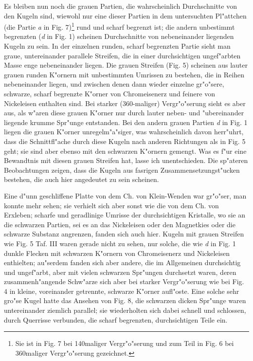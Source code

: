 \documentclass[a4paper, 11pt, oneside]{article}
\begin{document}
Es bleiben nun noch die grauen Partien, die wahrscheinlich Durchschnitte von den Kugeln sind, wiewohl nur eine dieser Partien in dem untersuchten Pl"attchen (die Partie \emph{a} in Fig. 7)\footnote{Sie ist in Fig. 7 bei 140maliger Vergr"o"serung und zum Teil in Fig. 6 bei 360maliger Vergr"o"serung gezeichnet.} rund und scharf begrenzt ist; die andern unbestimmt begrenzten (\emph{d} in Fig. 1) scheinen Durchschnitte von nebeneinander liegenden Kugeln zu sein. In der einzelnen runden, scharf begrenzten Partie sieht man graue, untereinander parallele Streifen, die in einer durchsichtigen ungef"arbten Masse enge nebeneinander liegen. Die grauen Streifen (Fig. 5) scheinen aus lauter grauen runden K"ornern mit unbestimmten Umrissen zu bestehen, die in Reihen nebeneinander liegen, und zwischen denen dann wieder einzelne gr"o"sere, schwarze, scharf begrenzte K"orner von Chromeisenerz und feinere von Nickeleisen enthalten sind. Bei starker (360-maliger) Vergr"o"serung sieht es aber aus, als w"aren diese grauen K"orner nur durch lauter neben- und "ubereinander liegende krumme Spr"unge entstanden. Bei den andern grauen Partien \emph{d} in Fig. 1 liegen die grauen K"orner unregelm"a"siger, was wahrscheinlich davon herr"uhrt, dass die Schnittfl"ache durch diese Kugeln nach anderen Richtungen als in Fig. 5 geht; sie sind aber ebenso mit den schwarzen K"ornern gemengt. Was es f"ur eine Bewandtnis mit diesen grauen Streifen hat, lasse ich unentschieden. Die sp"ateren Beobachtungen zeigen, dass die Kugeln aus fasrigen Zusammensetzungst"ucken bestehen, die auch hier angedeutet zu sein scheinen.

Eine d"unn geschliffene Platte von dem Ch. von Klein-Wenden war gr"o"ser, man konnte mehr sehen; sie verhielt sich aber sonst wie die von dem Ch. von Erxleben; scharfe und geradlinige Umrisse der durchsichtigen Kristalle, wo sie an die schwarzen Partien, sei es an das Nickeleisen oder den Magnetkies oder die schwarze Substanz angrenzen, fanden sich auch hier. Kugeln mit grauen Streifen wie Fig. 5 Taf. III waren gerade nicht zu sehen, nur solche, die wie \emph{d} in Fig. 1 dunkle Flecken mit schwarzen K"ornern von Chromeisenerz und Nickeleisen enthielten; au"serdem fanden sich aber andere, die im Allgemeinen durchsichtig und ungef"arbt, aber mit vielen schwarzen Spr"ungen durchsetzt waren, deren zusammenh"angende Schw"arze sich aber bei starker Vergr"o"serung wie bei Fig. 4 in kleine, voreinander getrennte, schwarze K"orner aufl"oste. Eine solche sehr gro"se Kugel hatte das Ansehen von Fig. 8, die schwarzen dicken Spr"unge waren untereinander ziemlich parallel; sie wiederholten sich dabei schnell und schlossen, durch Querrisse verbunden, die scharf begrenzten, durchsichtigen Teile ein.
\end{document}
